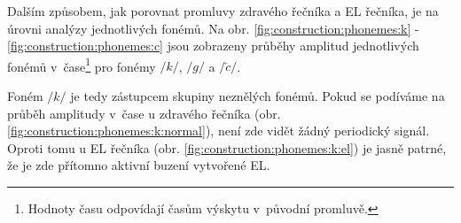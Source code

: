 Dalším způsobem, jak porovnat promluvy zdravého řečníka a EL řečníka, je na úrovni analýzy jednotlivých fonémů.
Na obr. \ref{fig:construction:phonemes:k} - \ref{fig:construction:phonemes:c} jsou zobrazeny průběhy amplitud jednotlivých fonémů v~čase\footnote{Hodnoty času odpovídají časům výskytu v~původní promluvě.} pro fonémy $/k/$, $/g/$ a $/\check{c}/$.

Foném $/k/$ je tedy zástupcem skupiny neznělých fonémů.
Pokud se podíváme na průběh amplitudy v~čase u zdravého řečníka (obr. \ref{fig:construction:phonemes:k:normal}), není zde vidět žádný periodický signál.
Oproti tomu u EL řečníka (obr. \ref{fig:construction:phonemes:k:el}) je jasně patrné, že je zde přítomno aktivní buzení vytvořené EL.

